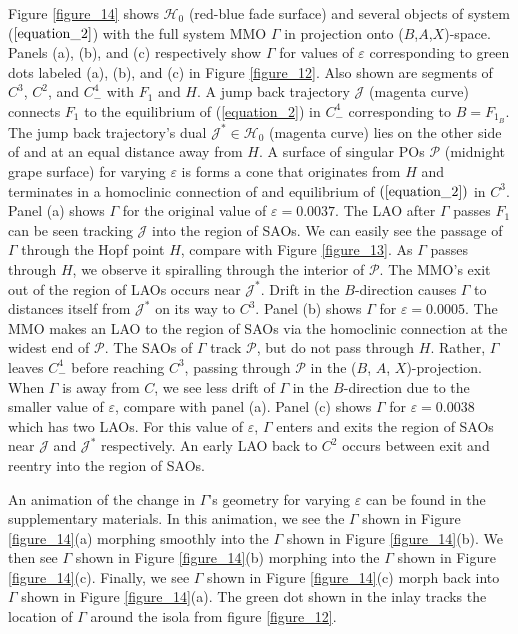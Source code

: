 \documentclass{ws-ijbc}
\begin{document}
Figure \ref{figure_14} shows $\mathscr{H}_0$ (red-blue fade surface) and several objects of system ($\ref{equation_2}$) with the full system MMO $\Gamma$ in projection onto ($B$,$A$,$X$)-space.  Panels (a), (b), and (c) respectively show $\Gamma$ for values of $\varepsilon$ corresponding to green dots labeled (a), (b), and (c) in Figure \ref{figure_12}.  Also shown are segments of $C^3$, $C^2$, and $C^4_-$ with $F_1$ and $H$.  A jump back trajectory $\mathscr{J}$ (magenta curve) connects $F_1$ to the equilibrium of (\ref{equation_2}) in $C^4_-$ corresponding to $B=F_{1_B}$.  The jump back trajectory's dual $\mathscr{J}^* \in \mathscr{H}_0$ (magenta curve) lies on the other side of and at an equal distance away from $H$.  A surface of singular POs $\mathscr{P}$ (midnight grape surface) for varying $\varepsilon$ is forms a cone that originates from $H$ and terminates in a homoclinic connection of and equilibrium of $(\ref{equation_2})$ in $C^3$.  Panel (a) shows $\Gamma$ for the original value of $\varepsilon=0.0037$.  The LAO after $\Gamma$ passes $F_1$ can be seen tracking $\mathscr{J}$ into the region of SAOs.  We can easily see the passage of $\Gamma$ through the Hopf point $H$, compare with Figure \ref{figure_13}.  As $\Gamma$ passes through $H$, we observe it spiralling through the interior of $\mathscr{P}$.  The MMO's exit out of the region of LAOs occurs near $\mathscr{J}^*$. Drift in the $B$-direction causes $\Gamma$ to distances itself from $\mathscr{J}^*$ on its way to $C^3$.  Panel (b) shows $\Gamma$ for $\varepsilon=0.0005$.  The MMO makes an LAO to the region of SAOs via the homoclinic connection at the widest end of $\mathscr{P}$.  The SAOs of $\Gamma$ track $\mathscr{P}$, but do not pass through $H$.  Rather, $\Gamma$ leaves $C^4_-$ before reaching $C^3$, passing through $\mathscr{P}$ in the ($B$, $A$, $X$)-projection.  When $\Gamma$ is away from $C$, we see less drift of $\Gamma$ in the $B$-direction due to the smaller value of $\varepsilon$, compare with panel (a).  Panel (c) shows $\Gamma$ for $\varepsilon=0.0038$ which has two LAOs.  For this value of $\varepsilon$, $\Gamma$ enters and exits the region of SAOs near $\mathscr{J}$ and $\mathscr{J}^*$ respectively.  An early LAO back to $C^2$ occurs between exit and reentry into the region of SAOs.

An animation of the change in $\Gamma$'s geometry for varying $\varepsilon$ can be found in the supplementary materials.  In this animation, we see the $\Gamma$ shown in Figure \ref{figure_14}(a) morphing smoothly into the $\Gamma$ shown in Figure \ref{figure_14}(b).  We then see $\Gamma$ shown in Figure \ref{figure_14}(b) morphing into the $\Gamma$ shown in Figure \ref{figure_14}(c).  Finally, we see $\Gamma$ shown in Figure \ref{figure_14}(c) morph back into $\Gamma$ shown in Figure \ref{figure_14}(a).  The green dot shown in the inlay tracks the location of $\Gamma$ around the isola from figure \ref{figure_12}.
\end{document}
